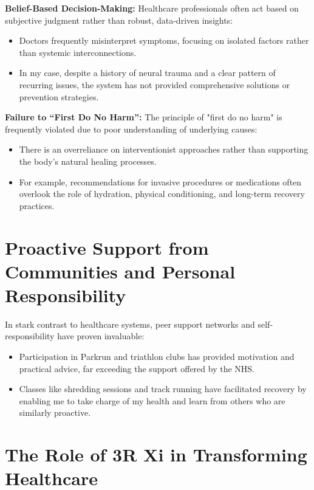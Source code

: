 \documentclass[a4paper,12pt]{article}
\begin{document}
\textbf{Belief-Based Decision-Making:}  
Healthcare professionals often act based on subjective judgment rather than robust, data-driven insights:
\begin{itemize}
    \item Doctors frequently misinterpret symptoms, focusing on isolated factors rather than systemic interconnections.
    \item In my case, despite a history of neural trauma and a clear pattern of recurring issues, the system has not provided comprehensive solutions or prevention strategies.
\end{itemize}

\textbf{Failure to “First Do No Harm”:}  
The principle of "first do no harm" is frequently violated due to poor understanding of underlying causes:
\begin{itemize}
    \item There is an overreliance on interventionist approaches rather than supporting the body’s natural healing processes.
    \item For example, recommendations for invasive procedures or medications often overlook the role of hydration, physical conditioning, and long-term recovery practices.
\end{itemize}

\section*{Proactive Support from Communities and Personal Responsibility}

In stark contrast to healthcare systems, peer support networks and self-responsibility have proven invaluable:
\begin{itemize}
    \item Participation in Parkrun and triathlon clubs has provided motivation and practical advice, far exceeding the support offered by the NHS.
    \item Classes like shredding sessions and track running have facilitated recovery by enabling me to take charge of my health and learn from others who are similarly proactive.
\end{itemize}

\section*{The Role of 3R Xi in Transforming Healthcare}
\end{document}
